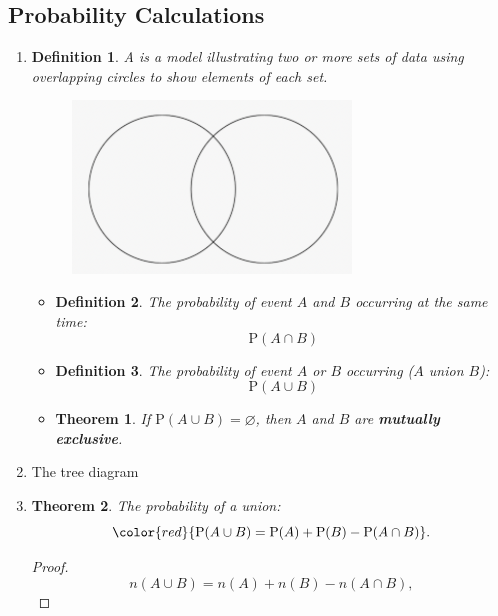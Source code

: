 \documentclass[12pt, a4paper]{article}
\newtheorem{theorem}{Theorem}[subsection]
\newtheorem{definition}{Definition}[subsection]
\newtheorem{proof}{Proof}[subsection]
\def\P{\mathrm{P}}
\begin{document}
\subsection{Probability Calculations}
\begin{enumerate}
    \item 
    \begin{definition} A \textbf{\color{red}{Venn diagram}} is a model illustrating two or more sets of data using overlapping circles to show elements of each set. 
        \begin{figure}[H]
            \center
            \includegraphics[width=0.7\textwidth]{Fig.4.5.jpg}
        \end{figure}
    \end{definition}
    \begin{itemize}
        \item \begin{definition}The probability of event $A$ and $B$ occurring at the same time: $$\P(A\cap B)$$\end{definition}
        \item \begin{definition}The probability of event $A$ or $B$ occurring ($A$ union $B$): $$\P(A\cup B)$$\end{definition}
        \item \begin{theorem}If $\P(A\cup B)=\varnothing$, then $A$ and $B$ are \textbf{mutually exclusive}.\end{theorem}
    \end{itemize}
    \item The tree diagram
    \item \begin{theorem}The probability of a union: $${\color{red}{\P(A\cup B)=\P(A)+\P(B)-\P(A\cap B)}}.$$\end{theorem}
    \begin{proof}
        $$n(A\cup B)=n(A)+n(B)-n(A\cap B),$$

\end{proof}
\end{enumerate}
\end{document}
